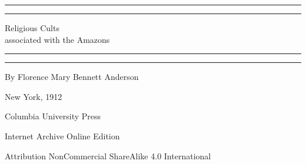 \documentclass[a4paper, 12pt, oneside]{article}
\begin{document}
\begin{titlepage} %
	\centering %
	\scshape %

	
	\rule{\textwidth}{1.6pt}\vspace*{-\baselineskip}\vspace*{2pt} %
	\rule{\textwidth}{0.4pt} %
	
	\vspace{0.75\baselineskip} %

        {\Huge Religious Cults \\associated with the Amazons} %
	
	\vspace{0.75\baselineskip} %
	
	\rule{\textwidth}{0.4pt}\vspace*{-\baselineskip}\vspace{3.2pt} %
	\rule{\textwidth}{1.6pt} %
	
	\vspace{1\baselineskip} %
	
	
	{By \large Florence Mary Bennett Anderson} %
	
	\vspace*{1\baselineskip} %
	
	
	\vspace{1\baselineskip} %

	
	
		
	\vspace*{\fill}%
	
	{\small New York, 1912}%
	
	{\small Columbia University Press} %

	\vspace{1\baselineskip} %

    Internet Archive Online Edition  %
	
	{\small Attribution NonCommercial ShareAlike 4.0 International } %
\end{titlepage}
\clearpage
\large
\tableofcontents
\clearpage
\end{document}
